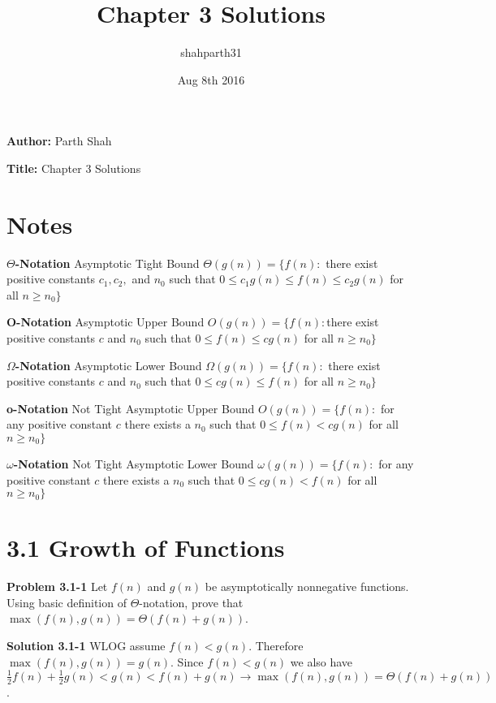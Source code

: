 \documentclass{article}
\title{Chapter 3 Solutions}
\author{shahparth31}
\date{Aug 8th 2016}
\begin{document}
\setlength{\parindent}{0pt}

\medskip

\hrulefill

\medskip

{\bf Author:} Parth Shah

\medskip

{\bf Title:} Chapter 3 Solutions

\hrulefill

\section*{Notes}
\textbf{$\Theta$-Notation} Asymptotic Tight Bound
$\Theta(g(n)) = \{f(n):$ there exist positive constants $c_1, c_2,$ and  $n_0$ such that $0 \leq c_1g(n) \leq f(n) \leq c_2g(n)$ for all $n \geq n_0 \}$

\medskip

\textbf{O-Notation} Asymptotic Upper Bound
$O(g(n)) = \{f(n): $there exist positive constants $c$ and $n_0$ such that $0 \leq f(n) \leq cg(n)$ for all $n \geq n_0 \}$
\medskip

\textbf{$\Omega$-Notation} Asymptotic Lower Bound
$\Omega(g(n)) = \{f(n):$ there exist positive constants $c$ and $n_0$ such that $0 \leq cg(n) \leq f(n)$ for all $n \geq n_0 \}$
\medskip

\textbf{o-Notation} Not Tight Asymptotic Upper Bound
$O(g(n)) = \{f(n):$ for any positive constant $c$ there exists a $n_0$ such that $0 \leq f(n) < cg(n)$ for all $n \geq n_0 \}$
\medskip

\textbf{$\omega$-Notation} Not Tight Asymptotic Lower Bound
$\omega(g(n)) = \{f(n):$ for any positive constant $c$ there exists a $n_0$ such that $0 \leq cg(n) < f(n)$ for all $n \geq n_0 \}$
\medskip

\section*{3.1 Growth of Functions}

\hrulefill

\medskip

\textbf{Problem 3.1-1} Let $f(n)$ and $g(n)$ be asymptotically nonnegative functions. Using basic definition of $\Theta$-notation, prove that $\max(f(n),g(n)) = \Theta(f(n) + g(n))$.

\medskip

\textbf{Solution 3.1-1} WLOG assume $f(n) < g(n)$. Therefore $\max(f(n),g(n)) = g(n)$. Since $f(n) < g(n)$ we also have $\frac{1}{2}f(n) + \frac{1}{2}g(n) < g(n) < f(n) + g(n) \rightarrow \max(f(n),g(n)) = \Theta(f(n) + g(n))$.
\end{document}
